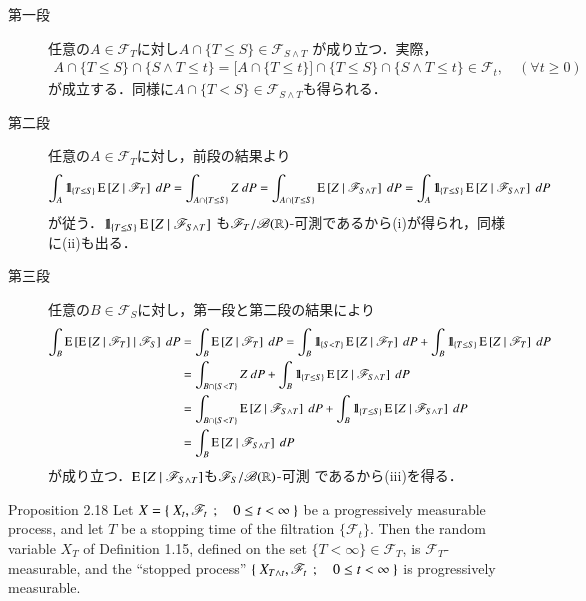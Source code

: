 	\begin{prf}\mbox{}
		\begin{description}
			\item[第一段]
				任意の$A \in \mathscr{F}_T$に対し$A \cap \{T \leq S\} \in \mathscr{F}_{S \wedge T}$
				が成り立つ．実際，
				\begin{align}
					A \cap \{T \leq S\} \cap \{S \wedge T \leq t\}
					= \biggl[ A \cap \{T \leq t\} \biggr] \cap \{T \leq S\} \cap \{S \wedge T \leq t\}
					\in \mathscr{F}_t,
					\quad (\forall t \geq 0)
				\end{align}
				が成立する．同様に$A \cap \{T < S\} \in \mathscr{F}_{S \wedge T}$も得られる．
				
			\item[第二段]
				任意の$A \in \mathscr{F}_T$に対し，前段の結果より
				\begin{align}
					\int_A \mbox{1}\hspace{-0.25em}\mbox{l}_{\{T \leq S\}} \operatorname{E} \left[ Z \ \middle|\ \mathscr{F}_T \right]\ dP
					= \int_{A \cap \{T \leq S\}} Z\ dP
					= \int_{A \cap \{T \leq S\}} \operatorname{E} \left[ Z \ \middle|\ \mathscr{F}_{S \wedge T} \right]\ dP
					= \int_A \mbox{1}\hspace{-0.25em}\mbox{l}_{\{T \leq S\}} \operatorname{E} \left[ Z \ \middle|\ \mathscr{F}_{S \wedge T} \right]\ dP
				\end{align}
				が従う．$\mbox{1}\hspace{-0.25em}\mbox{l}_{\{T \leq S\}} \operatorname{E} \left[ Z \ \middle|\ \mathscr{F}_{S \wedge T} \right]$
				も$\mathscr{F}_T/\mathscr{B}(\mathbb{R})$-可測であるから(i)が得られ，同様に(ii)も出る．
			
			\item[第三段]
				任意の$B \in \mathscr{F}_S$に対し，第一段と第二段の結果により
				\begin{align}
					\int_B \operatorname{E} \left[ \operatorname{E} \left[ Z \ \middle|\ \mathscr{F}_T \right] \ \middle|\ \mathscr{F}_S \right]\ dP
					&= \int_B \operatorname{E} \left[ Z \ \middle|\ \mathscr{F}_T \right]\ dP
					= \int_B \mbox{1}\hspace{-0.25em}\mbox{l}_{\{S < T\}} \operatorname{E} \left[ Z \ \middle|\ \mathscr{F}_T \right]\ dP
						+ \int_B \mbox{1}\hspace{-0.25em}\mbox{l}_{\{T \leq S\}} \operatorname{E} \left[ Z \ \middle|\ \mathscr{F}_T \right]\ dP \\
					&= \int_{B \cap \{S < T\}} Z\ dP
						+ \int_B \mbox{1}\hspace{-0.25em}\mbox{l}_{\{T \leq S\}} \operatorname{E} \left[ Z \ \middle|\ \mathscr{F}_{S \wedge T} \right]\ dP \\
					&= \int_{B \cap \{S < T\}} \operatorname{E} \left[ Z \ \middle|\ \mathscr{F}_{S \wedge T} \right]\ dP
						+ \int_B \mbox{1}\hspace{-0.25em}\mbox{l}_{\{T \leq S\}} \operatorname{E} \left[ Z \ \middle|\ \mathscr{F}_{S \wedge T} \right]\ dP \\
					&= \int_B \operatorname{E} \left[ Z \ \middle|\ \mathscr{F}_{S \wedge T} \right]\ dP
				\end{align}
				が成り立つ．$\operatorname{E} \left[ Z \ \middle|\ \mathscr{F}_{S \wedge T} \right]$も$\mathscr{F}_S/\mathscr{B}(\mathbb{R})$-可測
				であるから(iii)を得る．
				\QED
		\end{description}
	\end{prf}
	
	\begin{itembox}[l]{Proposition 2.18}\label{chapter_1_Problem_2_18}
		Let $X = \left\{\ X_t,\mathscr{F}_t\ \, ; \quad 0 \leq t < \infty\ \right\}$ be a progressively measurable 
		process, and let $T$ be a stopping time of the filtration $\{\mathscr{F}_t\}$. 
		Then the random variable $X_T$ of Definition 1.15, defined on the set 
		$\{T < \infty\} \in \mathscr{F}_T$, is $\mathscr{F}_T$-measurable, and
		the ``stopped process'' $\left\{\ X_{T \wedge t},\mathscr{F}_t\ \, ; \quad 0 \leq t < \infty\ \right\}$
		is progressively measurable.
	\end{itembox}
	
